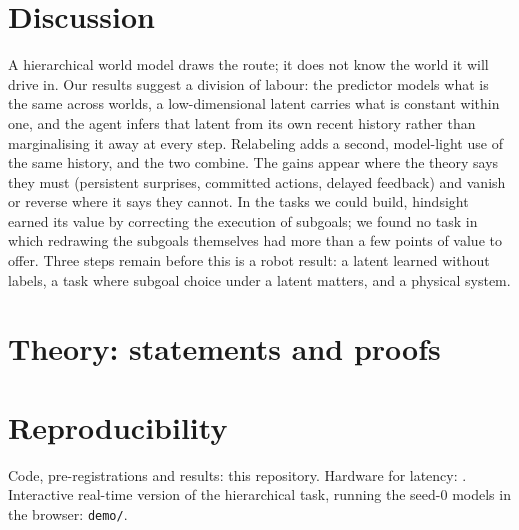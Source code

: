 \documentclass[11pt]{article}
\begin{document}
\section{Discussion}
A hierarchical world model draws the route; it does not know the world it will drive in. Our results suggest a division
of labour: the predictor models what is the same across worlds, a low-dimensional latent carries what is constant within
one, and the agent infers that latent from its own recent history rather than marginalising it away at every step.
Relabeling adds a second, model-light use of the same history, and the two combine. The gains appear where the theory
says they must (persistent surprises, committed actions, delayed feedback) and vanish or reverse where it says they
cannot. In the tasks we could build, hindsight earned its value by correcting the execution of subgoals; we found no
task in which redrawing the subgoals themselves had more than a few points of value to offer. Three steps remain before
this is a robot result: a latent learned without labels, a task where subgoal choice under a latent matters, and a
physical system.




\appendix
\section{Theory: statements and proofs}
\label{sec:theory-full}


\section{Reproducibility}
Code, pre-registrations and results: this repository. Hardware for latency: \latCPU. Interactive real-time version of the
hierarchical task, running the seed-0 models in the browser: \texttt{demo/}.
\end{document}
